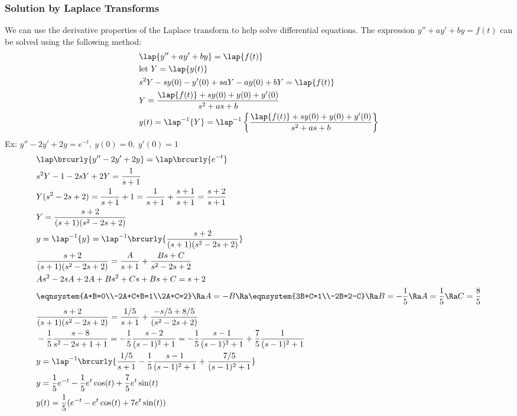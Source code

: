 \subsubsection{Solution by Laplace Transforms}
We can use the derivative properties of the Laplace transform to help solve differential equations. The expression $y''+ay'+by=f(t)$ can be solved using the following method:
\begin{align*}
    &\lap\{y''+ay'+by\}=\lap\{f(t)\}\\
    &\text{let }Y=\lap\{y(t)\}\\
    &s^2Y-sy(0)-y'(0)+saY-ay(0)+bY=\lap\{f(t)\}\\
    &Y=\frac{\lap\{f(t)\}+sy(0)+y(0)+y'(0)}{s^2+as+b}\\
    &y(t)=\lap^{-1}\{Y\}=\lap^{-1}\left\{\frac{\lap\{f(t)\}+sy(0)+y(0)+y'(0)}{s^2+as+b}\right\}
\end{align*}
Ex: $y''-2y'+2y=e^{-t},\ y(0)=0,\ y'(0)=1$
\begin{align*}
    &\lap\brcurly{y''-2y'+2y}=\lap\brcurly{e^{-t}}\\
    &s^2Y-1-2sY+2Y=\frac{1}{s+1}\\
    &Y(s^2-2s+2)=\frac{1}{s+1}+1=\frac{1}{s+1}+\frac{s+1}{s+1}=\frac{s+2}{s+1}\\
    &Y=\frac{s+2}{(s+1)(s^2-2s+2)}\\
    &y=\lap^{-1}\{y\}=\lap^{-1}\brcurly{\frac{s+2}{(s+1)(s^2-2s+2)}}\\
    &\frac{s+2}{(s+1)(s^2-2s+2)}=\frac{A}{s+1}+\frac{Bs+C}{s^2-2s+2}\\
    &As^2-2sA+2A+Bs^2+Cs+Bs+C=s+2\\
    &\eqnsystem{A+B=0\\-2A+C+B=1\\2A+C=2}\Ra A=-B\Ra \eqnsystem{3B+C=1\\-2B=2-C}\Ra B=-\frac{1}{5}\Ra A=\frac{1}{5}\Ra C=\frac{8}{5}\\
    &\frac{s+2}{(s+1)(s^2-2s+2)}=\frac{1/5}{s+1}+\frac{-s/5+8/5}{(s^2-2s+2)}\\
    &-\frac{1}{5}\frac{s-8}{s^2-2s+1+1}=-\frac{1}{5}\frac{s-2}{(s-1)^2+1}=-\frac{1}{5}\frac{s-1}{(s-1)^2+1}+\frac{7}{5}\frac{1}{(s-1)^2+1}\\
    &y=\lap^{-1}\brcurly{\frac{1/5}{s+1}-\frac{1}{5}\frac{s-1}{(s-1)^2+1}+\frac{7/5}{(s-1)^2+1}}\\
    &y=\frac{1}{5}e^{-t}-\frac{1}{5}e^t\cos(t)+\frac{7}{5}e^t\sin(t)\\
    &y(t)=\frac{1}{5}(e^{-t}-e^t\cos(t)+7e^t\sin(t))
\end{align*}
